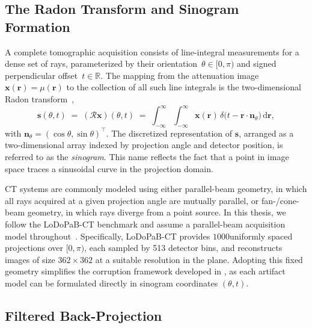 \subsection{The Radon Transform and Sinogram Formation}
\label{subsec:bg_radon}

A complete tomographic acquisition consists of line-integral measurements for a dense set of rays, parameterized by their orientation~$\theta \in [0,\pi)$ and signed
perpendicular offset~$t \in \mathbb{R}$. The mapping from the attenuation image $\boldsymbol{x}(\boldsymbol{r}) = \mu(\boldsymbol{r})$ to the collection of all such line
integrals is the two-dimensional Radon transform~\cite{Radon1917, KakSlaney1988},
\begin{equation}
    \boldsymbol{s}(\theta, t) \;=\; (\mathcal{R}\boldsymbol{x})(\theta, t)
    \;=\; \int_{-\infty}^{\infty}\!\!\int_{-\infty}^{\infty} \boldsymbol{x}(\boldsymbol{r})\,
        \delta\bigl(t - \boldsymbol{r}\!\cdot\!\boldsymbol{n}_{\theta}\bigr)\,\mathrm{d}\boldsymbol{r},
    \label{eq:radon}
\end{equation}
with $\boldsymbol{n}_{\theta} = (\cos\theta, \sin\theta)^{\!\top}$. The discretized representation of $\boldsymbol{s}$, arranged as a two-dimensional array indexed by projection angle and detector position, is referred to as the \emph{sinogram}. This name reflects the fact that a point in image space traces a sinusoidal curve in the projection domain.

CT systems are commonly modeled using either parallel-beam geometry, in which all rays acquired at a given projection angle are mutually parallel, or fan-/cone-beam geometry, in which rays diverge from a point source. In this thesis, we follow the LoDoPaB-CT benchmark and assume a parallel-beam acquisition model throughout~\cite{Leuschner2021}. Specifically, LoDoPaB-CT provides $1000$uniformly spaced projections over $[0,\pi)$, each sampled by 513 detector bins, and reconstructs images of size $362\times362$ at a suitable resolution in the plane. Adopting this fixed geometry simplifies the corruption framework developed in , as each artifact model can be formulated directly in sinogram coordinates $(\theta, t)$.

\subsection{Filtered Back-Projection}
\label{subsec:bg_fbp}


